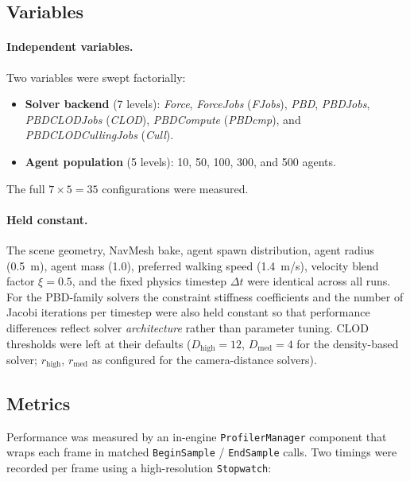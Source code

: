 \subsection{Variables}

\paragraph{Independent variables.}  Two variables were swept
factorially:

\begin{itemize}[topsep=2pt,itemsep=2pt]
    \item \textbf{Solver backend} (7 levels): \textit{Force},
    \textit{ForceJobs} (\textit{FJobs}), \textit{PBD},
    \textit{PBDJobs}, \textit{PBDCLODJobs} (\textit{CLOD}),
    \textit{PBDCompute} (\textit{PBDcmp}), and
    \textit{PBDCLODCullingJobs} (\textit{Cull}).
    \item \textbf{Agent population} (5 levels): 10, 50, 100, 300, and
    500 agents.
\end{itemize}

The full $7\times 5 = 35$ configurations were measured.

\paragraph{Held constant.}  The scene geometry, NavMesh bake, agent
spawn distribution, agent radius (0.5~m), agent mass (1.0), preferred
walking speed (1.4~m/s), velocity blend factor $\xi = 0.5$, and the
fixed physics timestep $\Delta t$ were identical across all runs.  For
the PBD-family solvers the constraint stiffness coefficients and the
number of Jacobi iterations per timestep were also held constant so that
performance differences reflect solver \emph{architecture} rather than
parameter tuning.  CLOD thresholds were left at their defaults
($D_{\mathrm{high}} = 12$, $D_{\mathrm{med}} = 4$ for the density-based
solver; $r_{\mathrm{high}}$, $r_{\mathrm{med}}$ as configured for the
camera-distance solvers).

\subsection{Metrics}

Performance was measured by an in-engine \texttt{ProfilerManager}
component that wraps each frame in matched \texttt{BeginSample} /
\texttt{EndSample} calls.  Two timings were recorded per frame using a
high-resolution \texttt{Stopwatch}:


